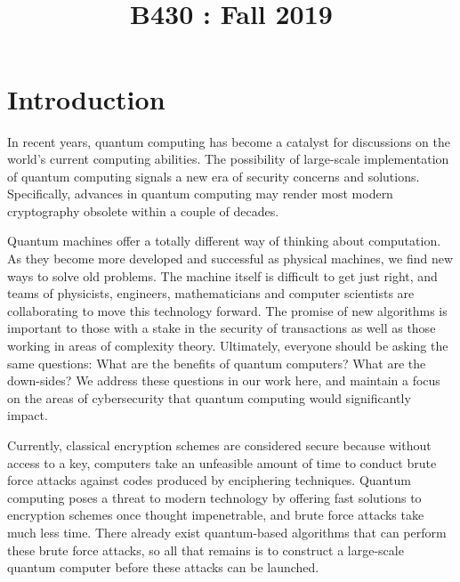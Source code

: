 \documentclass[11pt]{article}
\title{
    \vspace{2in}
    \textmd{\textbf{\tit}}\\
    \normalsize\vspace{0.1in}\small{B430 : Fall 2019 }\\
    \vspace{0.1in}\large{\textit{\auths}}
    \vspace{3in}
}
\date{}
\begin{document}
\maketitle
\pagebreak


\section{Introduction}


In recent years, quantum computing has become a catalyst for discussions on the world's current computing abilities. The possibility of large-scale implementation of quantum computing signals a new era of security concerns and solutions. Specifically, advances in quantum computing may render most modern cryptography obsolete within a couple of decades. 

Quantum machines offer a totally different way of thinking about computation. As they
become more developed and successful as physical machines,
we find new ways to solve old problems.
The machine itself is difficult to get just right, and teams of physicists,
engineers, mathematicians and computer scientists are collaborating to move this technology
forward. The promise of new algorithms is important to those with a stake in
the security of transactions as well as those working in areas of complexity theory.
Ultimately, everyone should be asking the same questions: What are the benefits of quantum computers? What are the down-sides? 
We address these questions in our work here, and maintain a focus on the areas of cybersecurity that quantum computing would significantly impact. 

Currently, classical encryption schemes are considered secure because without access to a key, computers take an unfeasible amount of time to conduct brute force attacks against codes produced by enciphering techniques. Quantum computing poses a threat to modern technology by offering fast solutions to encryption schemes once thought impenetrable, and brute force attacks take much less time. There already exist quantum-based algorithms that can perform these brute force attacks, so all that remains is to construct a large-scale quantum computer before these attacks can be launched.
\end{document}
